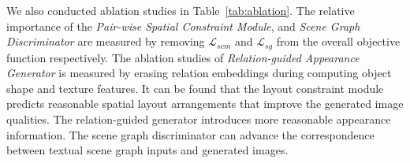We also conducted ablation studies in Table~\ref{tab:ablation}. The relative importance of the \textit{Pair-wise Spatial Constraint Module}, and \textit{Scene Graph Discriminator} are measured by removing $\mathcal{L}_{scm}$ and $\mathcal{L}_{sg}$ from the overall objective function respectively. The ablation studies of \textit{Relation-guided Appearance Generator} is measured by erasing relation embeddings during computing object shape and texture features. 
It can be found that the layout constraint module predicts reasonable spatial layout arrangements that improve the generated image qualities. The relation-guided generator introduces more reasonable appearance information. The scene graph discriminator can advance the correspondence between textual scene graph inputs and generated images. %

\begin{table}[!t]
\centering
\small
{}
\caption{Ablation studies conducted on our proposed method. The experimental results are reported on 128$\times$128 resolution image generation task in Visual Genome.}\label{tab:ablation}
\end{table}

